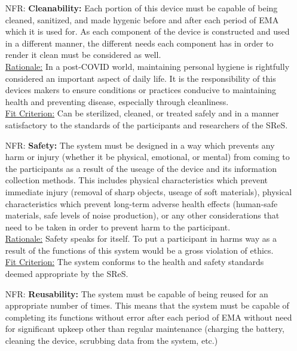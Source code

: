 \documentclass[12pt]{article}
\newcounter{nfrnum} %
\begin{document}
\begin{itemize}
\item[NFR\refstepcounter{nfrnum}\thenfrnum \label{NFR_Cleanabiity}:]
  \textbf{Cleanability:} Each portion of this device must be capable of being cleaned, sanitized, and made hygenic before and after each period of EMA which it is used for. As each component of the device is constructed and used in a different manner, the different needs each component has in order to render it clean must be considered as well.\\


\underline{Rationale:} In a post-COVID world, maintaining personal hygiene is rightfully considered an important aspect of daily life. It is the responsibility of this devices makers to ensure conditions or practices conducive to maintaining health and preventing disease, especially through cleanliness.\\

\underline{Fit Criterion:} Can be sterilized, cleaned, or treated safely and in a manner satisfactory to the standards of the participants and researchers of the SReS.\\


\item[NFR\refstepcounter{nfrnum}\thenfrnum \label{NFR_Safety}:]
  \textbf{Safety:} The system must be designed in a way which prevents any harm or injury (whether it be physical, emotional, or mental) from coming to the participants as a result of the useage of the device and its information collection methods. This includes physical characteristics which prevent immediate injury (removal of sharp objects, useage of soft materials), physical characteristics which prevent long-term adverse health effects (human-safe materials, safe levels of noise production), or any other considerations that need to be taken in order to prevent harm to the participant.\\


\underline{Rationale:} Safety speaks for itself. To put a participant in harms way as a result of the functions of this system would be a gross violation of ethics.\\

\underline{Fit Criterion:} The system conforms to the health and safety standards deemed appropriate by the SReS.\\

\item[NFR\refstepcounter{nfrnum}\thenfrnum \label{NFR_Reusability}:]
  \textbf{Reusability:} The system must be capable of being reused for an appropriate number of times. This means that the system must be capable of completing its functions without error after each period of EMA without need for significant upkeep other than regular maintenance (charging the battery, cleaning the device, scrubbing data from the system, etc.)\\


\end{itemize}
\end{document}
